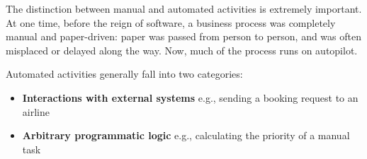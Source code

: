 	The distinction between manual and automated activities is extremely important. At one time, before the reign of
	software, a business process was completely manual and paper-driven: paper was passed from person to person, and was
	often misplaced or delayed along the way. Now, much of the process runs on autopilot.

	Automated activities generally fall into two categories:
	\begin{itemize}
		\item \textbf{Interactions with external systems} e.g., sending a booking request to an airline
		\item \textbf{Arbitrary programmatic logic} e.g., calculating the priority of a manual task	   
	\end{itemize}
